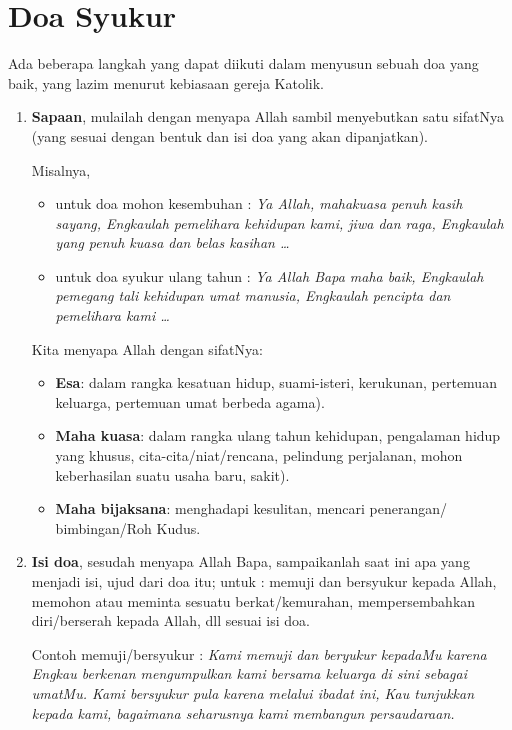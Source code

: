 \section{Doa Syukur}
Ada beberapa langkah yang dapat diikuti dalam menyusun sebuah doa yang baik, yang lazim menurut kebiasaan gereja Katolik.

\begin{enumerate}[label=\textbf{\Roman*.}]
\item  \textbf{Sapaan}, mulailah dengan menyapa Allah sambil menyebutkan satu sifatNya (yang sesuai dengan bentuk dan isi doa yang akan dipanjatkan). 

Misalnya, 

\begin{itemize}
\item untuk doa mohon kesembuhan : \textit{Ya Allah, mahakuasa penuh kasih sayang, Engkaulah pemelihara kehidupan kami, jiwa dan raga, Engkaulah yang penuh kuasa dan belas kasihan \ldots }

\item untuk doa syukur ulang tahun : \textit{Ya Allah Bapa maha baik, Engkaulah pemegang tali kehidupan umat manusia, Engkaulah pencipta dan pemelihara kami \ldots}
\end{itemize}

Kita menyapa Allah dengan sifatNya: 
\begin{itemize}
\item \textbf{Esa}: dalam rangka kesatuan hidup, suami-isteri, kerukunan, pertemuan keluarga, pertemuan umat berbeda agama). 
\item \textbf{Maha kuasa}: dalam rangka ulang tahun kehidupan, pengalaman hidup yang khusus, cita-cita/niat/rencana, pelindung perjalanan, mohon keberhasilan suatu usaha baru, sakit). 

\item \textbf{Maha bijaksana}: menghadapi kesulitan, mencari penerangan/ bimbingan/Roh Kudus.  

\end{itemize}

\item \textbf{Isi doa}, sesudah menyapa Allah Bapa, sampaikanlah saat ini apa yang menjadi isi, ujud dari doa itu;  untuk : memuji dan bersyukur kepada Allah, memohon atau meminta sesuatu berkat/kemurahan, mempersembahkan diri/berserah kepada Allah, dll sesuai isi doa.

Contoh memuji/bersyukur : \textit{Kami memuji dan beryukur kepadaMu karena Engkau berkenan mengumpulkan kami bersama keluarga di sini sebagai umatMu. Kami bersyukur pula karena melalui ibadat ini, Kau tunjukkan kepada kami, bagaimana seharusnya kami membangun persaudaraan.}


\end{enumerate}
